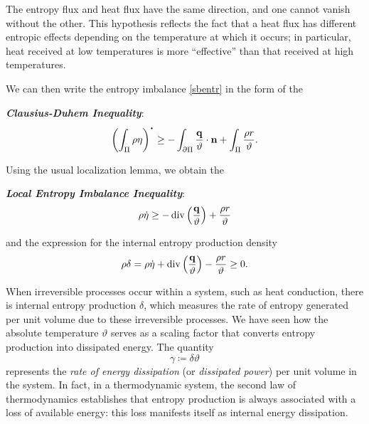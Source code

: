 The entropy flux and heat flux have the same direction, and one cannot vanish without the other. This hypothesis reflects the fact that a heat flux has different entropic effects depending on the temperature at which it occurs; in particular, heat received at low temperatures is more ``effective'' than that received at high temperatures.

We can then write the entropy imbalance \eqref{sbentr} in the form of the

\begin{definition}
	\noindent \textbf{\textit{Clausius-Duhem Inequality}}:
	\begin{equation}
		\left( \int_{\Pi}\rho\eta \right)^{\mathop{\vcenter{\hbox{\Large$\cdot$}}}}\geq -\int_{\partial\Pi}\frac{\qb}{\vartheta} \cdot \nb +\int_{\Pi} \frac{\rho r}{\vartheta}.
	\end{equation}
\end{definition}

Using the usual localization lemma, we obtain the 
\begin{definition}
	\textbf{\textit{Local Entropy Imbalance Inequality}}:
	\begin{equation}
	\rho	\dot \eta \geq -\operatorname{div} \left( \frac{\mathbf{q}}{\vartheta} \right)+\frac{\rho r}{\vartheta}
	\end{equation}
\end{definition}
and the expression for the internal entropy production density
\begin{equation}\label{delta}
\rho	\delta=\rho \dot{\eta}+\operatorname{div} \left( \frac{\mathbf{q}}{\vartheta} \right)-\frac{\rho r}{\vartheta}\geq 0.
\end{equation}

When irreversible processes occur within a system, such as heat conduction, there is internal entropy production $\delta$, which measures the rate of entropy generated per unit volume due to these irreversible processes. We have seen how the absolute temperature $\vartheta$ serves as a scaling factor that converts entropy production into dissipated energy. The quantity
\begin{equation}
	\gamma\coloneqq\delta\vartheta
\end{equation}
represents the \textit{rate of energy dissipation} (or \textit{dissipated power}) per unit volume in the system. In fact, in a thermodynamic system, the second law of thermodynamics establishes that entropy production is always associated with a loss of available energy: this loss manifests itself as internal energy dissipation.

